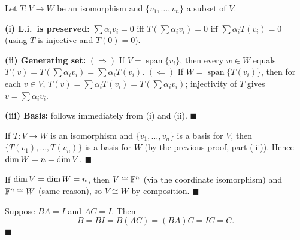 \begin{proofbox}
Let $T:V\to W$ be an isomorphism and $\{v_1,\ldots,v_n\}$ a subset of
$V$.

\textbf{(i) L.i.\ is preserved:}
$\sum\alpha_i v_i=0$ iff $T(\sum\alpha_i v_i)=0$ iff
$\sum\alpha_i T(v_i)=0$ (using $T$ is injective and $T(0)=0$).

\textbf{(ii) Generating set:}
$(\Rightarrow)$ If $V=\operatorname{span}\{v_i\}$, then every $w\in W$
equals $T(v)=T(\sum\alpha_i v_i)=\sum\alpha_i T(v_i)$.
$(\Leftarrow)$ If $W=\operatorname{span}\{T(v_i)\}$, then for each $v\in V$,
$T(v)=\sum\alpha_i T(v_i)=T(\sum\alpha_i v_i)$; injectivity of $T$ gives
$v=\sum\alpha_i v_i$.

\textbf{(iii) Basis:} follows immediately from (i) and (ii). \hfill$\blacksquare$
\end{proofbox}

\begin{proofbox}
If $T:V\to W$ is an isomorphism and $\{v_1,\ldots,v_n\}$ is a basis for
$V$, then $\{T(v_1),\ldots,T(v_n)\}$ is a basis for $W$ (by the previous
proof, part (iii)).  Hence $\operatorname{dim} W=n=\operatorname{dim} V$. \hfill$\blacksquare$
\end{proofbox}

\begin{proofbox}
If $\operatorname{dim} V=\operatorname{dim} W=n$, then $V\cong\mathbb{F}^n$ (via the coordinate isomorphism)
and $\mathbb{F}^n\cong W$ (same reason), so $V\cong W$ by composition. \hfill$\blacksquare$
\end{proofbox}

\begin{proofbox}
Suppose $BA=I$ and $AC=I$.  Then
\[
    B = BI = B(AC) = (BA)C = IC = C.
\]
\hfill$\blacksquare$
\end{proofbox}
